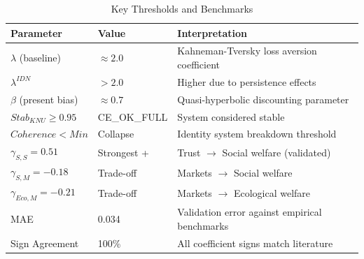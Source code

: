 \begin{longtable}{@{}lp{3cm}p{8cm}@{}}
\caption{Key Thresholds and Benchmarks} \\
\toprule
\textbf{Parameter} & \textbf{Value} & \textbf{Interpretation} \\
\midrule
\endfirsthead
\midrule
\endhead
\bottomrule
\endlastfoot

$\lambda$ (baseline) & $\approx 2.0$ & Kahneman-Tversky loss aversion coefficient \\
$\lambda^{IDN}$ & $> 2.0$ & Higher due to persistence effects \\
$\beta$ (present bias) & $\approx 0.7$ & Quasi-hyperbolic discounting parameter \\
\addlinespace
$Stab_{KNU} \geq 0.95$ & CE\_OK\_FULL & System considered stable \\
$Coherence < Min$ & Collapse & Identity system breakdown threshold \\
\addlinespace
$\gamma_{S,S} = 0.51$ & Strongest + & Trust $\to$ Social welfare (validated) \\
$\gamma_{S,M} = -0.18$ & Trade-off & Markets $\to$ Social welfare \\
$\gamma_{Eco,M} = -0.21$ & Trade-off & Markets $\to$ Ecological welfare \\
\addlinespace
MAE & 0.034 & Validation error against empirical benchmarks \\
Sign Agreement & 100\% & All coefficient signs match literature \\

\end{longtable}


